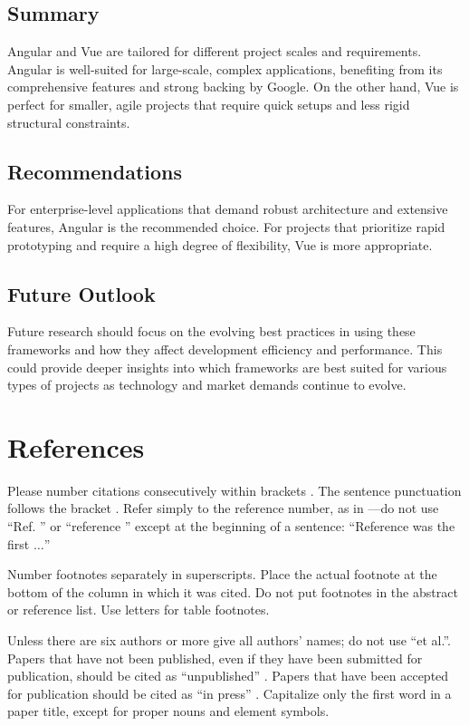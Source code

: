 \documentclass[conference]{IEEEtran}
\begin{document}
\subsection{Summary}
Angular and Vue are tailored for different project scales and requirements. Angular is well-suited for large-scale, complex applications, benefiting from its comprehensive features and strong backing by Google. On the other hand, Vue is perfect for smaller, agile projects that require quick setups and less rigid structural constraints.

\subsection{Recommendations}
For enterprise-level applications that demand robust architecture and extensive features, Angular is the recommended choice. For projects that prioritize rapid prototyping and require a high degree of flexibility, Vue is more appropriate.

\subsection{Future Outlook}
Future research should focus on the evolving best practices in using these frameworks and how they affect development efficiency and performance. This could provide deeper insights into which frameworks are best suited for various types of projects as technology and market demands continue to evolve.

\section*{References}

Please number citations consecutively within brackets \cite{b1}. The 
sentence punctuation follows the bracket \cite{b2}. Refer simply to the reference 
number, as in \cite{b3}---do not use ``Ref. \cite{b3}'' or ``reference \cite{b3}'' except at 
the beginning of a sentence: ``Reference \cite{b3} was the first $\ldots$''

Number footnotes separately in superscripts. Place the actual footnote at 
the bottom of the column in which it was cited. Do not put footnotes in the 
abstract or reference list. Use letters for table footnotes.

Unless there are six authors or more give all authors' names; do not use 
``et al.''. Papers that have not been published, even if they have been 
submitted for publication, should be cited as ``unpublished'' \cite{b4}. Papers 
that have been accepted for publication should be cited as ``in press'' \cite{b5}. 
Capitalize only the first word in a paper title, except for proper nouns and 
element symbols.
\end{document}
